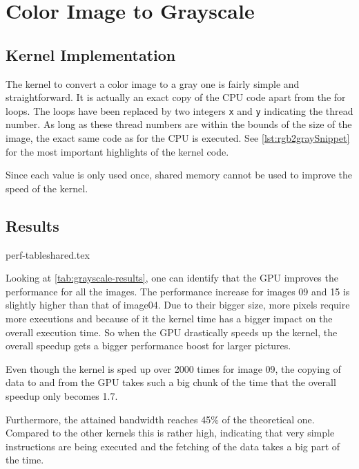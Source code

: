 \documentclass[final]{report}
\begin{document}
\chapter{Color Image to Grayscale}\label{ch:grayscale}

\section{Kernel Implementation}\label{sec:rgb2gray}
The kernel to convert a color image to a gray one is fairly simple and straightforward.
It is actually an exact copy of the CPU code apart from the for loops.
The loops have been replaced by two integers \texttt{x} and \texttt{y} indicating the thread number.
As long as these thread numbers are within the bounds of the size of the image, the exact same code as for the CPU is executed.
See \cref{lst:rgb2graySnippet} for the most important highlights of the kernel code.


Since each value is only used once, shared memory cannot be used to improve the speed of the kernel.


\section{Results}
{perf-tableshared.tex}

Looking at \cref{tab:grayscale-results}, one can identify that the GPU improves the performance for all the images.
The performance increase for images 09 and 15 is slightly higher than that of image04.
Due to their bigger size, more pixels require more executions and because of it the kernel time has a bigger impact on the overall execution time.
So when the GPU drastically speeds up the kernel, the overall speedup gets a bigger performance boost for larger pictures.

Even though the kernel is sped up over 2000 times for image 09, the copying of data to and from the GPU takes such a big chunk of the time that the overall speedup only becomes 1.7.

Furthermore, the attained bandwidth reaches 45\% of the theoretical one.
Compared to the other kernels this is rather high, indicating that very simple instructions are being executed and the fetching of the data takes a big part of the time.
\end{document}
